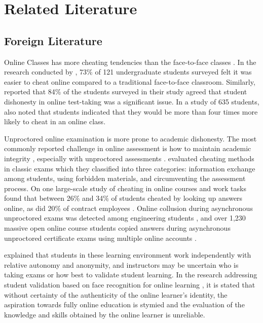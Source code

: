 \chapter{Related Literature}

\section{Foreign Literature}

Online Classes has more cheating tendencies than the face-to-face classes \cite{watson2010cheating}.
In the research conducted by , 73\% of 121 undergraduate students surveyed felt it was easier to cheat online compared to a traditional face-to-face classroom.
Similarly,  reported that 84\% of the students surveyed in their study agreed that student dishonesty in online test-taking was a significant issue.
In a study of 635 students,  also noted that students indicated that they would be more than four times more likely to cheat in an online class.

Unproctored online examination is more prone to academic dishonesty.
The most commonly reported challenge in online assessment is how to maintain academic integrity \cite{hollister2009proctored}, especially with unproctored assessments \cite{arnold2016cheating}.
 evaluated cheating methods in classic exams which they classified into three categories: information exchange among students, using forbidden materials, and circumventing the assessment process.
On one large-scale study of cheating in online courses and work tasks found that between 26\% and 34\% of students cheated by looking up answers online, as did 20\% of contract employees \cite{corrigan2015deterring}.
Online collusion during asynchronous unproctored exams was detected among engineering students \cite{de2015calculated}, and over 1,230 massive open online course students copied answers during asynchronous unproctored certificate exams using multiple online accounts \cite{northcutt2016detecting}.

 explained that students in these learning environment work independently with relative autonomy and anonymity, and instructors may be uncertain who is taking exams or how best to validate student learning.
In the research addressing student validation based on face recognition for online learning \cite{labayen2014smowl}, it is stated that without certainty of the authenticity of the online learner’s identity, the aspiration towards fully online education is stymied and the evaluation of the knowledge and skills obtained by the online learner is unreliable.

